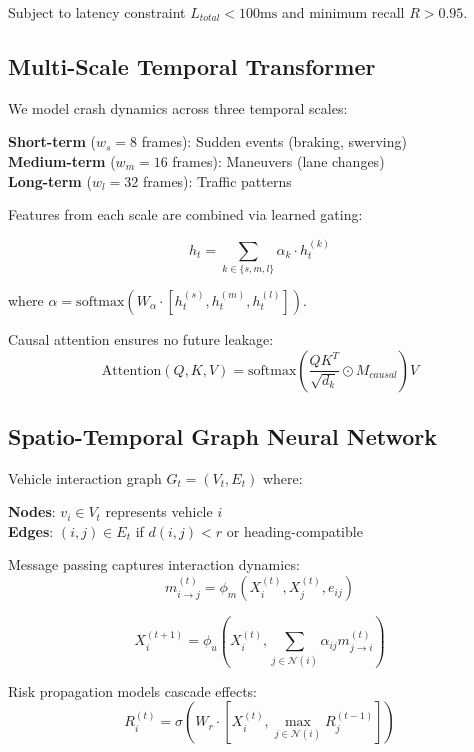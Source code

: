 \documentclass[conference]{IEEEtran}
\begin{document}
Subject to latency constraint $L_{total} < 100\text{ms}$ and minimum recall $R > 0.95$.

\subsection{Multi-Scale Temporal Transformer}

We model crash dynamics across three temporal scales:

\textbf{Short-term} ($w_s=8$ frames): Sudden events (braking, swerving)\\
\textbf{Medium-term} ($w_m=16$ frames): Maneuvers (lane changes)\\
\textbf{Long-term} ($w_l=32$ frames): Traffic patterns

Features from each scale are combined via learned gating:

\begin{equation}
h_t = \sum_{k \in \{s,m,l\}} \alpha_k \cdot h_t^{(k)}
\end{equation}

where $\alpha = \text{softmax}(W_\alpha \cdot [h_t^{(s)}, h_t^{(m)}, h_t^{(l)}])$.

Causal attention ensures no future leakage:
\begin{equation}
\text{Attention}(Q, K, V) = \text{softmax}\left(\frac{QK^T}{\sqrt{d_k}} \odot M_{causal}\right)V
\end{equation}

\subsection{Spatio-Temporal Graph Neural Network}

Vehicle interaction graph $G_t = (V_t, E_t)$ where:

\textbf{Nodes}: $v_i \in V_t$ represents vehicle $i$\\
\textbf{Edges}: $(i,j) \in E_t$ if $d(i,j) < r$ or heading-compatible

Message passing captures interaction dynamics:
\begin{equation}
m_{i \rightarrow j}^{(t)} = \phi_m(X_i^{(t)}, X_j^{(t)}, e_{ij})
\end{equation}

\begin{equation}
X_i^{(t+1)} = \phi_u\left(X_i^{(t)}, \sum_{j \in \mathcal{N}(i)} \alpha_{ij} m_{j \rightarrow i}^{(t)}\right)
\end{equation}

Risk propagation models cascade effects:
\begin{equation}
R_i^{(t)} = \sigma\left(W_r \cdot [X_i^{(t)}, \max_{j \in \mathcal{N}(i)} R_j^{(t-1)}]\right)
\end{equation}
\end{document}
